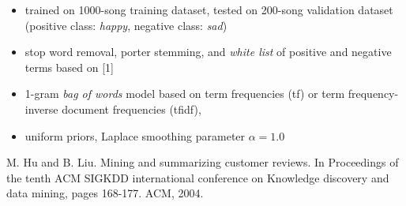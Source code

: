 \documentclass{article}
\begin{document}
\begin{itemize}

\item trained on 1000-song training dataset, tested on 200-song validation dataset (positive class: \emph{happy}, negative class: \emph{sad})
\item stop word removal, porter stemming, and \emph{white list} of positive and negative terms based on [1]
\item 1-gram \emph{bag of words} model based on term frequencies (tf) or term frequency-inverse document frequencies (tfidf),
\item uniform priors, Laplace smoothing parameter $\alpha=1.0$

\end{itemize}

\noindent [1] M. Hu and B. Liu. Mining and summarizing customer reviews. In Proceedings of the tenth ACM SIGKDD international conference on Knowledge discovery and data mining, pages 168-177. ACM, 2004.
\end{document}
